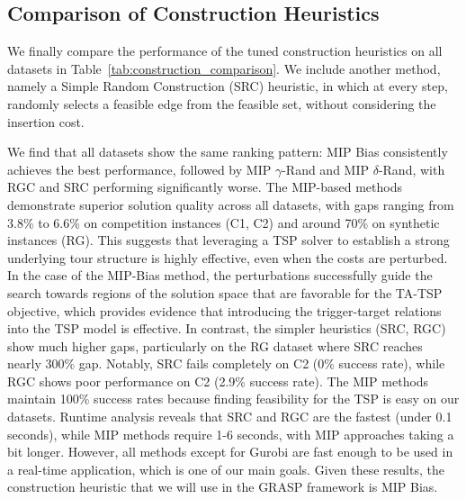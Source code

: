 \subsection{Comparison of Construction Heuristics}

We finally compare the performance of the tuned construction heuristics on all datasets in Table~\ref{tab:construction_comparison}.
We include another method, namely a Simple Random Construction (SRC) heuristic, in which at every step, randomly selects a feasible edge from the feasible set, without considering the insertion cost.

We find that all datasets show the same ranking pattern: MIP Bias consistently achieves the best performance, followed by MIP $\gamma$-Rand and MIP $\delta$-Rand, with RGC and SRC performing significantly worse.
The MIP-based methods demonstrate superior solution quality across all datasets, with gaps ranging from 3.8\% to 6.6\% on competition instances (C1, C2) and around 70\% on synthetic instances (RG).
This suggests that leveraging a TSP solver to establish a strong underlying tour structure is highly effective, even when the costs are perturbed.
In the case of the MIP-Bias method, the perturbations successfully guide the search towards regions of the solution space that are favorable for the TA-TSP objective, which provides evidence that introducing the trigger-target relations into the TSP model is effective.
In contrast, the simpler heuristics (SRC, RGC) show much higher gaps, particularly on the RG dataset where SRC reaches nearly 300\% gap. Notably, SRC fails completely on C2 (0\% success rate), while RGC shows poor performance on C2 (2.9\% success rate).
The MIP methods maintain 100\% success rates because finding feasibility for the TSP is easy on our datasets. Runtime analysis reveals that SRC and RGC are the fastest (under 0.1 seconds), while MIP methods require 1-6 seconds, with MIP approaches taking a bit longer.
However, all methods except for Gurobi are fast enough to be used in a real-time application, which is one of our main goals.
Given these results, the construction heuristic that we will use in the GRASP framework is MIP Bias.


